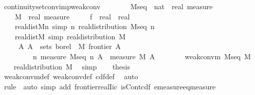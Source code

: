 \documentclass[leqno]{article}
\theoremstyle{definition}
\begin{document}
\begin{isabellebody}
\isamarkupfalse%
\ continuity{\isacharunderscore}set{\isacharunderscore}conv{\isacharunderscore}imp{\isacharunderscore}weak{\isacharunderscore}conv{\isacharcolon}\isanewline
\ \ \ \isanewline
\ \ \ \ M{\isacharunderscore}seq\ {\isacharcolon}{\isacharcolon}\ {\isachardoublequoteopen}nat\ {\isasymRightarrow}\ real\ measure{\isachardoublequoteclose}\ \isanewline
\ \ \ \ M\ {\isacharcolon}{\isacharcolon}\ {\isachardoublequoteopen}real\ measure{\isachardoublequoteclose}\ \isanewline
\ \ \ \ f\ {\isacharcolon}{\isacharcolon}\ {\isachardoublequoteopen}real\ {\isasymRightarrow}\ real{\isachardoublequoteclose}\isanewline
\ \ \ \isanewline
\ \ \ \ real{\isacharunderscore}dist{\isacharunderscore}Mn\ {\isacharbrackleft}simp{\isacharbrackright}{\isacharcolon}\ {\isachardoublequoteopen}{\isasymAnd}n{\isachardot}\ real{\isacharunderscore}distribution\ {\isacharparenleft}M{\isacharunderscore}seq\ n{\isacharparenright}{\isachardoublequoteclose}\ \ \isanewline
\ \ \ \ real{\isacharunderscore}dist{\isacharunderscore}M\ {\isacharbrackleft}simp{\isacharbrackright}{\isacharcolon}\ {\isachardoublequoteopen}real{\isacharunderscore}distribution\ M{\isachardoublequoteclose}\ \ \isanewline
\ \ \ \ {\isacharasterisk}{\isacharcolon}\ {\isachardoublequoteopen}{\isasymAnd}A{\isachardot}\ A\ {\isasymin}\ sets\ borel\ {\isasymLongrightarrow}\ M\ {\isacharparenleft}frontier\ A{\isacharparenright}\ {\isacharequal}\ {}\ {\isasymLongrightarrow}\isanewline
\ \ \ \ \ \ \ \ {\isacharparenleft}{\isasymlambda}\ n{\isachardot}\ {\isacharparenleft}measure\ {\isacharparenleft}M{\isacharunderscore}seq\ n{\isacharparenright}\ A{\isacharparenright}{\isacharparenright}\ {\isacharminus}{\isacharminus}{\isacharminus}{\isacharminus}{\isachargreater}\ measure\ M\ A{\isachardoublequoteclose}\isanewline
\ \ \ \isanewline
\ \ \ \ {\isachardoublequoteopen}weak{\isacharunderscore}conv{\isacharunderscore}m\ M{\isacharunderscore}seq\ M{\isachardoublequoteclose}\isanewline
{}\isamarkupfalse%
\ {\isacharminus}\isanewline
\ \ \isamarkupfalse%
\ real{\isacharunderscore}distribution\ M\ \isamarkupfalse%
\ simp\isanewline
\ \ \isamarkupfalse%
\ {\isacharquery}thesis\isanewline
\ \ \ \isamarkupfalse%
\ weak{\isacharunderscore}conv{\isacharunderscore}m{\isacharunderscore}def\ weak{\isacharunderscore}conv{\isacharunderscore}def\ cdf{\isacharunderscore}def{}\ \isamarkupfalse%
\ auto\isanewline
\ \ \ \isamarkupfalse%
\ {\isacharparenleft}rule\ {\isacharasterisk}{\isacharcomma}\ auto\ simp\ add{\isacharcolon}\ frontier{\isacharunderscore}real{\isacharunderscore}Iic\ isCont{\isacharunderscore}cdf\ emeasure{\isacharunderscore}eq{\isacharunderscore}measure{\isacharparenright}\isanewline
{}\isamarkupfalse%
\end{isabellebody}
\end{document}
